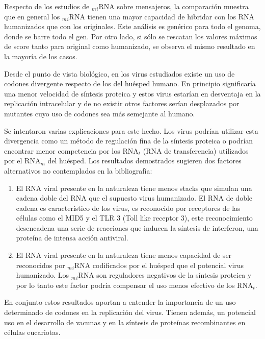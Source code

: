 \par Respecto de los estudios de $_m$$_i$RNA sobre mensajeros, la comparación muestra que en general los $_m$$_i$RNA tienen una mayor capacidad de hibridar con los RNA humanizados que con los originales. Este análisis es genérico para todo el genoma, donde se barre todo el gen. Por otro lado, si sólo se rescatan los valores máximos de score tanto para original como humanizado, se observa el mismo resultado en la mayoría de los casos.

\par Desde el punto de vista biológico, en los virus estudiados existe un uso de codones divergente respecto de los del huésped humano. En principio significaría una menor velocidad de síntesis proteica y estos virus estarían en desventaja en la replicación intracelular y de no existir otros factores serían desplazados por mutantes cuyo uso de codones sea más semejante al humano.

\par Se intentaron varias explicaciones para este hecho. Los virus podrían utilizar esta divergencia como un método de regulación fina de la síntesis proteica o podrían encontrar menor competencia por los RNA$_t$ (RNA de transferencia) utilizados por el RNA$_m$ del huésped. Los resultados demostrados sugieren dos factores alternativos no contemplados en la bibliografía:

\begin{enumerate}
\item El RNA viral presente en la naturaleza tiene menos stacks que simulan una cadena doble del RNA que el supuesto virus humanizado. El RNA de doble cadena es característico de los virus, es reconocido por receptores de las células como el MID5 y el TLR 3  (Toll like receptor 3), este reconocimiento desencadena una serie de reacciones que inducen la síntesis de interferon, una proteína de intensa acción antiviral.

\item El RNA viral presente en la naturaleza tiene menos capacidad de ser reconocidos por $_m$$_i$RNA codificados por el huésped que el potencial virus humanizado. Los $_m$$_i$RNA son reguladores negativos de la síntesis proteica y por lo tanto este factor podría compensar el uso menos efectivo de los RNA$_t$.
\end{enumerate}

\par En conjunto estos resultados aportan a entender la importancia de un uso determinado de codones en la replicación del virus. Tienen además, un potencial uso en el desarrollo de vacunas y en la síntesis de proteínas recombinantes en células eucariotas. 

